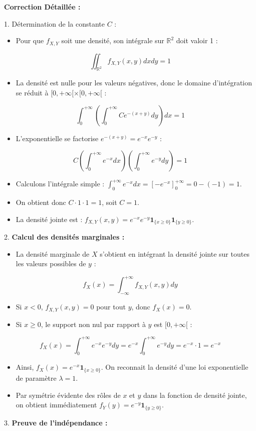 \documentclass[11pt,a4paper]{article}
\begin{document}
\textbf{Correction Détaillée :}

1. \textit{}Détermination de la constante $C$ :\textit{}
\begin{itemize}
\item Pour que $f_{X,Y}$ soit une densité, son intégrale sur $\mathbb{R}^2$ doit valoir 1 :
\end{itemize}     $$ \iint_{\mathbb{R}^2} f_{X,Y}(x,y) dx dy = 1 $$
\begin{itemize}
\item La densité est nulle pour les valeurs négatives, donc le domaine d'intégration se réduit à $[0, +\infty[ \times [0, +\infty[$ :
\end{itemize}     $$ \int_{0}^{+\infty} \left( \int_{0}^{+\infty} C e^{-(x+y)} dy \right) dx = 1 $$
\begin{itemize}
\item L'exponentielle se factorise $e^{-(x+y)} = e^{-x}e^{-y}$ :
\end{itemize}     $$ C \left( \int_{0}^{+\infty} e^{-x} dx \right) \left( \int_{0}^{+\infty} e^{-y} dy \right) = 1 $$
\begin{itemize}
\item Calculons l'intégrale simple : $\int_{0}^{+\infty} e^{-x} dx = [-e^{-x}]_{0}^{+\infty} = 0 - (-1) = 1$.
\item On obtient donc $C \cdot 1 \cdot 1 = 1$, soit $C = 1$.
\item La densité jointe est : $f_{X,Y}(x,y) = e^{-x}e^{-y} \mathbf{1}_{\{x \geq 0\}} \mathbf{1}_{\{y \geq 0\}}$.
\end{itemize}2. \textbf{Calcul des densités marginales :}
\begin{itemize}
\item La densité marginale de $X$ s'obtient en intégrant la densité jointe sur toutes les valeurs possibles de $y$ :
\end{itemize}     $$ f_X(x) = \int_{-\infty}^{+\infty} f_{X,Y}(x,y) dy $$
\begin{itemize}
\item Si $x < 0$, $f_{X,Y}(x,y) = 0$ pour tout $y$, donc $f_X(x) = 0$.
\item Si $x \geq 0$, le support non nul par rapport à $y$ est $[0, +\infty[$ :
\end{itemize}     $$ f_X(x) = \int_{0}^{+\infty} e^{-x}e^{-y} dy = e^{-x} \int_{0}^{+\infty} e^{-y} dy = e^{-x} \cdot 1 = e^{-x} $$
\begin{itemize}
\item Ainsi, $f_X(x) = e^{-x} \mathbf{1}_{\{x \geq 0\}}$. On reconnait la densité d'une loi exponentielle de paramètre $\lambda=1$.
\item Par symétrie évidente des rôles de $x$ et $y$ dans la fonction de densité jointe, on obtient immédiatement $f_Y(y) = e^{-y} \mathbf{1}_{\{y \geq 0\}}$.
\end{itemize}3. \textbf{Preuve de l'indépendance :}
\end{document}
